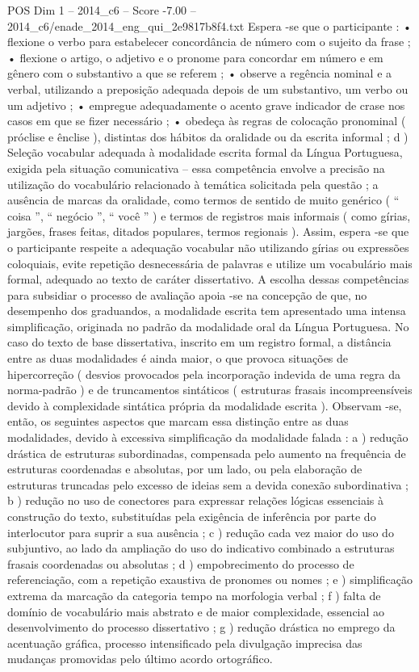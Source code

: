 \begin{textsample}{POS Dim 1 – 2014\_c6 – Score -7.00 – 2014\_c6/enade\_2014\_eng\_qui\_2e9817b8f4.txt}
Espera -se que o participante : • flexione o verbo para estabelecer concordância de número com o sujeito da frase ; • flexione o artigo, o adjetivo e o pronome para concordar em número e em gênero com o substantivo a que se referem ; • observe a regência nominal e a verbal, utilizando a preposição adequada depois de um substantivo, um verbo ou um adjetivo ; • empregue adequadamente o acento grave indicador de crase nos casos em que se fizer necessário ; • obedeça às regras de colocação pronominal ( próclise e ênclise ), distintas dos hábitos da oralidade ou da escrita informal ; d ) Seleção vocabular adequada à modalidade escrita formal da Língua Portuguesa, exigida pela situação comunicativa – essa competência envolve a precisão na utilização do vocabulário relacionado à temática solicitada pela questão ; a ausência de marcas da oralidade, como termos de sentido de muito genérico ( “ coisa ”, “ negócio ”, “ você ” ) e termos de registros mais informais ( como gírias, jargões, frases feitas, ditados populares, termos regionais ).
Assim, espera -se que o participante respeite a adequação vocabular não utilizando gírias ou expressões coloquiais, evite repetição desnecessária de palavras e utilize um vocabulário mais formal, adequado ao texto de caráter dissertativo.
A escolha dessas competências para subsidiar o processo de avaliação apoia -se na concepção de que, no desempenho dos graduandos, a modalidade escrita tem apresentado uma intensa simplificação, originada no padrão da modalidade oral da Língua Portuguesa.
No caso do texto de base dissertativa, inscrito em um registro formal, a distância entre as duas modalidades é ainda maior, o que provoca situações de hipercorreção ( desvios provocados pela incorporação indevida de uma regra da norma-padrão ) e de truncamentos sintáticos ( estruturas frasais incompreensíveis devido à complexidade sintática própria da modalidade escrita ).
Observam -se, então, os seguintes aspectos que marcam essa distinção entre as duas modalidades, devido à excessiva simplificação da modalidade falada : a ) redução drástica de estruturas subordinadas, compensada pelo aumento na frequência de estruturas coordenadas e absolutas, por um lado, ou pela elaboração de estruturas truncadas pelo excesso de ideias sem a devida conexão subordinativa ; b ) redução no uso de conectores para expressar relações lógicas essenciais à construção do texto, substituídas pela exigência de inferência por parte do interlocutor para suprir a sua ausência ; c ) redução cada vez maior do uso do subjuntivo, ao lado da ampliação do uso do indicativo combinado a estruturas frasais coordenadas ou absolutas ; d ) empobrecimento do processo de referenciação, com a repetição exaustiva de pronomes ou nomes ; e ) simplificação extrema da marcação da categoria tempo na morfologia verbal ; f ) falta de domínio de vocabulário mais abstrato e de maior complexidade, essencial ao desenvolvimento do processo dissertativo ; g ) redução drástica no emprego da acentuação gráfica, processo intensificado pela divulgação imprecisa das mudanças promovidas pelo último acordo ortográfico.

\end{textsample}
